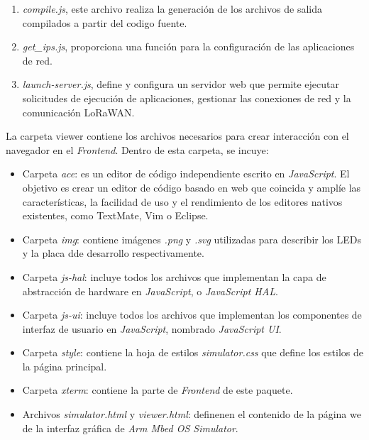 \begin{enumerate}
    \item \textit{compile.js}, este archivo realiza la generación de los archivos de salida compilados a partir del codigo fuente.

    \item \textit{get\_ips.js}, proporciona una función para la configuración de las aplicaciones de red.

    \item \textit{launch-server.js}, define y configura un servidor web que permite ejecutar solicitudes de ejecución de aplicaciones, gestionar las conexiones de red y la comunicación LoRaWAN.	
\end{enumerate}
 
La carpeta \textquotedbl viewer\textquotedbl{} contiene los archivos necesarios para crear interacción con el navegador en el \textit{Frontend}. Dentro de esta carpeta, se incuye:

\begin{itemize}
    \item Carpeta \textit{ace}: es un editor de código independiente escrito en \textit{JavaScript}. El objetivo es crear un editor de código basado en web que coincida y amplíe las características, la facilidad de uso y el rendimiento de los editores nativos existentes, como TextMate, Vim o Eclipse. 
    \item Carpeta \textit{img}: contiene imágenes \textit{.png} y \textit{.svg} utilizadas para describir los LEDs y la placa dde desarrollo respectivamente.
    \item Carpeta \textit{js-hal}: incluye todos los archivos que implementan la capa de abstracción de hardware en \textit{JavaScript}, o \textit{JavaScript HAL}.
    \item Carpeta \textit{js-ui}: incluye todos los archivos que implementan los componentes de interfaz de usuario en \textit{JavaScript}, nombrado \textit{JavaScript UI}.
    \item Carpeta \textit{style}: contiene la hoja de estilos \textit{simulator.css} que define los estilos de la página principal.
    \item Carpeta \textit{xterm}: contiene la parte de \textit{Frontend} de este paquete.
    \item Archivos \textit{simulator.html} y \textit{viewer.html}: definenen el contenido de la página we de la interfaz gráfica de \textit{Arm Mbed OS Simulator}.
\end{itemize}
 
